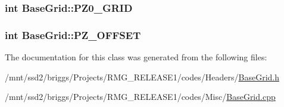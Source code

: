 \hypertarget{class_base_grid_ae6982519f986a2308089e1f61becc723}{
\subsubsection[{P\-Z0\-\_\-\-G\-R\-I\-D}]{\setlength{\rightskip}{0pt plus 5cm}int Base\-Grid\-::\-P\-Z0\-\_\-\-G\-R\-I\-D\hspace{0.3cm}{\ttfamily [static]}}}\label{class_base_grid_ae6982519f986a2308089e1f61becc723}
\hypertarget{class_base_grid_abda1ba4dad93bab180bf9ceb89458910}{
\subsubsection[{P\-Z\-\_\-\-O\-F\-F\-S\-E\-T}]{\setlength{\rightskip}{0pt plus 5cm}int Base\-Grid\-::\-P\-Z\-\_\-\-O\-F\-F\-S\-E\-T\hspace{0.3cm}{\ttfamily [static]}}}\label{class_base_grid_abda1ba4dad93bab180bf9ceb89458910}


The documentation for this class was generated from the following files\-:\begin{DoxyCompactItemize}
\item 
/mnt/ssd2/briggs/\-Projects/\-R\-M\-G\-\_\-\-R\-E\-L\-E\-A\-S\-E1/codes/\-Headers/\hyperlink{_base_grid_8h}{Base\-Grid.\-h}\item 
/mnt/ssd2/briggs/\-Projects/\-R\-M\-G\-\_\-\-R\-E\-L\-E\-A\-S\-E1/codes/\-Misc/\hyperlink{_base_grid_8cpp}{Base\-Grid.\-cpp}\end{DoxyCompactItemize}
